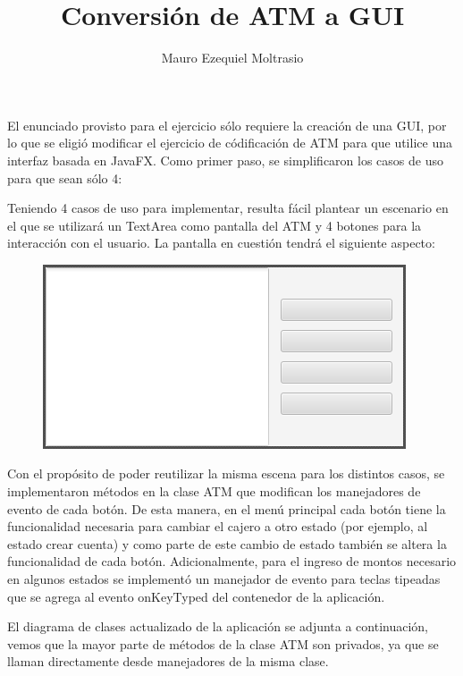 \documentclass[a4paper,titlepage]{article}
\title{Conversión de ATM a GUI}
\author{Mauro Ezequiel Moltrasio}
\date{}
\begin{document}
\maketitle

El enunciado provisto para el ejercicio sólo requiere la creación de una GUI,
por lo que se eligió modificar el ejercicio de códificación de ATM para que
utilice una interfaz basada en JavaFX. Como primer paso, se simplificaron los
casos de uso para que sean sólo 4:

\begin{figure}[H]
    \centering
    \scalebox{.75}{
        
    }
\end{figure}

Teniendo 4 casos de uso para implementar, resulta fácil plantear un escenario
en el que se utilizará un TextArea como pantalla del ATM y 4 botones para la
interacción con el usuario. La pantalla en cuestión tendrá el siguiente
aspecto:

\begin{figure}[H]
    \centering
    \includegraphics[scale=0.5]{imgs/atm-fxml.png}
\end{figure}

Con el propósito de poder reutilizar la misma escena para los distintos casos,
se implementaron métodos en la clase ATM que modifican los manejadores de
evento de cada botón. De esta manera, en el menú principal cada botón tiene
la funcionalidad necesaria para cambiar el cajero a otro estado (por ejemplo,
al estado crear cuenta) y como parte de este cambio de estado también se altera
la funcionalidad de cada botón. Adicionalmente, para el ingreso de montos
necesario en algunos estados se implementó un manejador de evento para teclas
tipeadas que se agrega al evento onKeyTyped del contenedor de la aplicación.

El diagrama de clases actualizado de la aplicación se adjunta a continuación,
vemos que la mayor parte de métodos de la clase ATM son privados, ya que se
llaman directamente desde manejadores de la misma clase.

\begin{figure}[H]
    \centering
    \scalebox{.5}{
        
    }
\end{figure}
\end{document}
